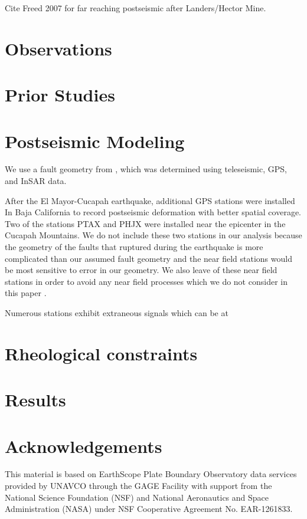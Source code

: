 \documentclass[12pt]{article}
\begin{document}
  Cite Freed 2007 for far reaching postseismic after Landers/Hector Mine.

\section*{Observations}

\section*{Prior Studies}

\section*{Postseismic Modeling}
  We use a fault geometry from \cite{W2011}, which was determined
  using teleseismic, GPS, and InSAR data.  

  After the El Mayor-Cucapah earthquake, additional GPS stations were
  installed In Baja California to record postseismic deformation with
  better spatial coverage.  Two of the stations PTAX and PHJX were
  installed near the epicenter in the Cucapah Mountains.  We do not
  include these two stations in our analysis because the geometry of
  the faults that ruptured during the earthquake is more complicated
  than our assumed fault geometry \cite{O2012} and the near field
  stations would be most sensitive to error in our geometry. We also
  leave of these near field stations in order to avoid any near field
  processes which we do not consider in this paper \cite{GO2014}.

   
  Numerous stations exhibit extraneous signals which can be at  
  \cite{A2007}

\section*{Rheological constraints}

\section*{Results}
\section*{Acknowledgements}
  This material is based on EarthScope Plate Boundary Observatory data
  services provided by UNAVCO through the GAGE Facility with support
  from the National Science Foundation (NSF) and National Aeronautics
  and Space Administration (NASA) under NSF Cooperative Agreement
  No. EAR-1261833.
\end{document}
